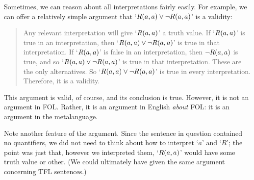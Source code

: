 Sometimes, we can reason about all interpretations fairly easily. For example, we can offer a relatively simple argument that `$\mathord{R}(a,a)\vee\neg \mathord{R}(a,a)$' is a validity:
	\begin{quote}
		\label{allmodels1}
		Any relevant interpretation will give `$\mathord{R}(a,a)$' a truth value. If `$\mathord{R}(a,a)$' is true in an interpretation, then `$\mathord{R}(a,a) \vee \neg\mathord{R}(a,a)$' is true in that interpretation. If `$\mathord{R}(a,a)$' is false in an interpretation, then $\neg\mathord{R}(a,a)$ is true, and so `$\mathord{R}(a,a) \vee\neg \mathord{R}(a,a)$' is true in that interpretation. These are the only alternatives. So `$\mathord{R}(a,a) \vee\neg \mathord{R}(a,a)$' is true in every interpretation. Therefore, it is a validity.
	\end{quote}
This argument is valid, of course, and its conclusion is true. However, it is not an argument in FOL. Rather, it is an argument in English \emph{about} FOL: it is an argument in the metalanguage. 

Note another feature of the argument. Since the sentence in question contained no quantifiers, we did not need to think about how to interpret `$a$' and `$R$'; the point was just that, however we interpreted them, `$\mathord{R}(a,a)$' would have some truth value or other. (We could ultimately have given the same argument concerning TFL sentences.)

